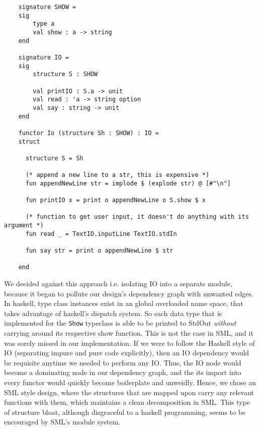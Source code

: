 \documentclass[9pt,letterpaper]{extarticle}
\begin{document}
  \begin{verbatim}
    signature SHOW =
    sig
        type a
        val show : a -> string
    end
    
    signature IO =
    sig
        structure S : SHOW
    
        val printIO : S.a -> unit
        val read : 'a -> string option
        val say : string -> unit
    end
    
    functor Io (structure Sh : SHOW) : IO =
    struct
    
      structure S = Sh
    
      (* append a new line to a str, this is expensive *)
      fun appendNewLine str = implode $ (explode str) @ [#"\n"]
    
      fun printIO x = print o appendNewLine o S.show $ x
    
      (* function to get user input, it doesn't do anything with its argument *)
      fun read _ = TextIO.inputLine TextIO.stdIn
    
      fun say str = print o appendNewLine $ str
    
    end
  \end{verbatim}
  We decided against this approach i.e. isolating IO into a separate module,
  because it began to pollute our design's dependency graph with unwanted edges.
  In haskell, type class instances exist in an global overloaded name space,
  that takes advantage of haskell's dispatch system. So each data type that is
  implemented for the \texttt{Show} typeclass is able to be printed to StdOut
  \textit{without} carrying around its respective show function. This is not the
  case in SML, and it was sorely missed in our implementation. If we were to
  follow the Haskell style of IO (separating impure and pure code explicitly),
  then an IO dependency would be requisite anytime we needed to perform any IO.
  Thus, the IO node would become a dominating node in our dependency graph, and
  the its import into every functor would quickly become boilerplate and
  unweidly. Hence, we chose an SML style design, where the structures that are
  mapped upon carry any relevant functions with them, which maintains a clean
  decomposition in SML. This type of structure bloat, although disgraceful to a
  haskell programming, seems to be encouraged by SML's module system.
\end{document}
